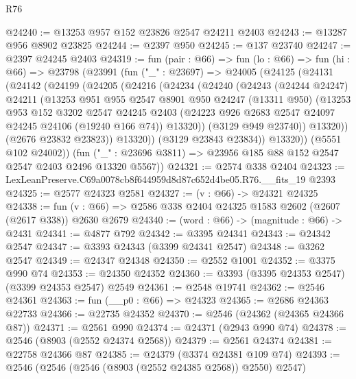 \begin{lexlean}{R76}
\begin{coremodule}
@24240 := @13253 @957 @152 @23826 @2547 @24211 @2403
@24243 := @13287 @956 @8902 @23825
@24244 := @2397 @950
@24245 := @137 @23740
@24247 := @2397 @24245 @2403
@24319 := fun (pair : @66) =>
  fun (lo : @66) =>
  fun (hi : @66) =>
  @23798
    (@23991
      (fun ("_" : @23697) =>
      @24005
        (@24125
          (@24131
            (@24142
              (@24199
                (@24205
                  (@24216
                    (@24234
                      (@24240
                        (@24243
                          (@24244 @24247)
                          @24211
                          (@13253
                            @951
                            @955
                            @2547
                            @8901
                            @950
                            @24247
                            (@13311 @950)
                            (@13253
                              @953
                              @152
                              @3202
                              @2547
                              @24245
                              @2403
                              (@24223 @926 @2683 @2547 @24097 @24245 @24106 (@19240 @166 @74))
                              @13320))
                          (@3129 @949 @23740))
                        @13320))
                    (@2676 @23832 @23823))
                  @13320))
              (@3129 @23843 @23834))
            @13320))
        (@5551 @102 @24002))
      (fun ("_" : @23696 @3811) => @23956 @185 @88 @152 @2547 @2547 @2403 @2496 @13320 @5567))
@24321 := @2574 @338 @2404
@24323 := LexLeanPreserve.C69a0078cb8f644959d8d87c652d4be05.R76.__fits_19 @2393
@24325 := @2577 @24323 @2581
@24327 := (v : @66) -> @24321 @24325
@24338 := fun (v : @66) => @2586 @338 @2404 @24325 @1583 @2602 (@2607 (@2617 @338)) @2630 @2679
@24340 := (word : @66) -> (magnitude : @66) -> @2431
@24341 := @4877 @792
@24342 := @3395 @24341
@24343 := @24342 @2547
@24347 := @3393 @24343 (@3399 @24341 @2547)
@24348 := @3262 @2547
@24349 := @24347 @24348
@24350 := @2552 @1001
@24352 := @3375 @990 @74
@24353 := @24350 @24352
@24360 := @3393 (@3395 @24353 @2547) (@3399 @24353 @2547) @2549
@24361 := @2548 @19741
@24362 := @2546 @24361
@24363 := fun (__p0 : @66) => @24323
@24365 := @2686 @24363 @22733
@24366 := @22735 @24352
@24370 := @2546 (@24362 (@24365 @24366 @87))
@24371 := @2561 @990
@24374 := @24371 (@2943 @990 @74)
@24378 := @2546 (@8903 (@2552 @24374 @2568))
@24379 := @2561 @24374
@24381 := @22758 @24366 @87
@24385 := @24379 (@3374 @24381 @109 @74)
@24393 := @2546 (@2546 (@2546 (@8903 (@2552 @24385 @2568)) @2550) @2547)

\end{coremodule}
\end{lexlean}

